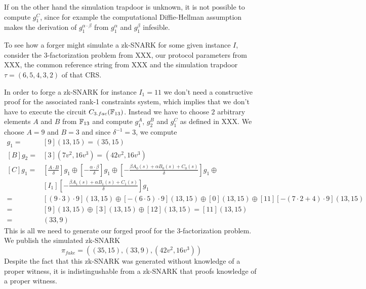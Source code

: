 If on the other hand the simulation trapdoor is unknown, it is not possible to compute $g_1^C$, since for example the computational Diffie-Hellman assumption makes the derivation of $g_1^{\alpha\cdot \beta}$ from $g_1^\alpha$ and $g_1^\beta$ infesible.
\begin{example} To see how a forger might simulate a  
zk-SNARK for some given instance $I$, consider the $3$-factorization problem from XXX, our protocol parameters from XXX, the common reference string from XXX and the simulation trapdoor $\tau = (6,5,4,3,2)$ of that CRS.

In order to forge a zk-SNARK for instance $I_1=11$ we don't need a constructive proof for the associated rank-1 constraints system, which implies that we don't have to execute the circuit $C_{3.fac}(\mathbb{F}_{13})$. Instead we have to choose $2$ arbitrary elements $A$ and $B$ from $\mathbb{F}_{13}$ and compute $g_1^A$, $g_2^B$ and $g_1^C$ as defined in XXX. We choose $A=9$ and $B=3$ and since $\delta^{-1}=3$, we compute
\begin{align*}
[A]g_1 =& [9](13,15) = (35,15)\\
[B]g_2 =& [3](7v^2,16v^3) = (42v^2,16v^3)\\
[C]g_1 =& [\frac{A\cdot B}{\delta}]g_1\oplus 
           [-\frac{\alpha\cdot\beta}{\delta}]g_1\oplus 
      [-\frac{\beta A_0(s) + \alpha B_0(s)+ C_0(s)}{\delta}]g_1\oplus\\
      &[I_1][-\frac{\beta A_1(s) + \alpha B_1(s)+ C_1(s)}{\delta}]g_1\\      
     = & [(9\cdot 3)\cdot 9 ](13,15)\oplus 
      [-(6\cdot 5)\cdot 9](13,15)\oplus 
      [0](13,15)\oplus 
      [11][-(7\cdot 2 + 4)\cdot 9](13,15)\\      
     = &[9](13,15)\oplus [3](13,15)\oplus [12](13,15)= [11](13,15)\\       
     = &(33,9)
\end{align*}
This is all we need to generate our forged proof for the $3$-factorization problem. We publish the simulated zk-SNARK
$$
\pi_{fake}=((35,15),(33,9),(42v^2,16v^3))
$$
Despite the fact that this zk-SNARK was generated without knowledge of a proper witness, it is indistingushable from a zk-SNARK that proofs knowledge of a proper witness. 


\end{example}

